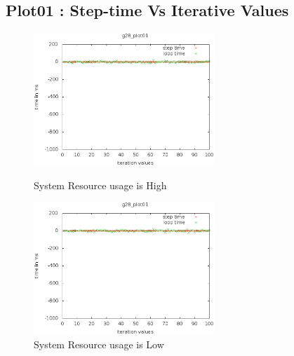 \documentclass[a4paper,11pt]{article}
\begin{document}
\begin{itemize}
\subsection{Plot01 : Step-time Vs Iterative Values}
 	\begin{figure}[ht]
	\begin{minipage}[ht]{0.5\linewidth}
	\includegraphics[height=50mm]{plots/g28_plot01.eps}
	\caption{System Resource usage is High }	
	\label{fig:ResourceIntensivePlot01}
	\end{minipage}	
	\begin{minipage}[ht]{0.5\linewidth}
	\includegraphics[height=50mm]{plots1/g28_plot01.eps}
	\caption{System Resource usage is Low}
	\label{fig:ResourceIntensivePlot01a}
	\end{minipage}	
	\end{figure}


\end{itemize}
\end{document}
